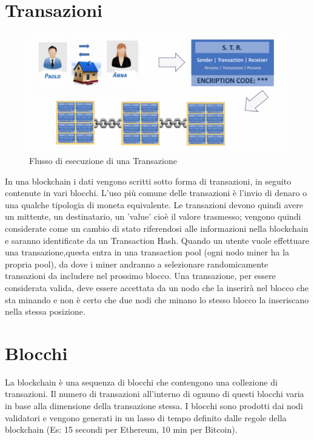 \documentclass[11pt,a4paper,titlepage, twoside, openright]{report}
\begin{document}
\section{Transazioni}

\begin{figure}[h]
	\includegraphics[width=\textwidth]{flusso_bc}
	\centering
	\caption{Flusso di esecuzione di una Transazione}
	\label{fig:fl_bc}
\end{figure}

In una blockchain i dati vengono scritti sotto forma di transazioni, in seguito contenute in vari blocchi. L'uso più comune delle transazioni è l'invio di denaro o una qualche tipologia di moneta equivalente. Le transazioni devono quindi avere un mittente, un destinatario, un 'value' cioè il valore trasmesso; vengono quindi considerate come un cambio di stato riferendosi alle informazioni nella blockchain e saranno identificate da un Transaction Hash. Quando un utente vuole effettuare una transazione,questa entra in una transaction pool (ogni nodo miner ha la propria pool), da dove i miner andranno a selezionare randomicamente transazioni da includere nel prossimo blocco. Una transazione, per essere considerata valida, deve essere accettata da un nodo che la inserirà nel blocco che sta minando e non è certo che due nodi che minano lo stesso blocco la inseriscano nella stessa posizione.

\section{Blocchi}
La blockchain è una sequenza di blocchi che contengono una collezione di transazioni. Il numero di transazioni all'interno di ognuno di questi blocchi varia in base alla dimensione della transazione stessa. I blocchi sono prodotti dai nodi validatori e vengono generati in un lasso di tempo definito dalle regole della blockchain (Es: 15 secondi per Ethereum, 10 min per Bitcoin).
\end{document}
